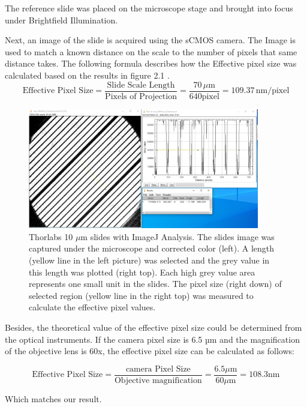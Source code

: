 \documentclass[a4paper,english,12pt,bibliography=totoc]{scrreprt}
\begin{document}
The reference slide was placed on the microscope stage and brought into focus under Brightfield Illumination.

Next, an image of the slide is acquired using the sCMOS camera. The Image is used to match a known distance on the scale to the number of pixels that same distance takes.
The following formula describes how the Effective pixel size was calculated based on the results in figure 2.1 .
\[
\text{Effective Pixel Size} = \frac{\text{Slide Scale Length}}{\text{Pixels of Projection}} = \frac{70 \, \mu\text{m}}{640 \text{pixel}} = 109.37  \, \text{nm/pixel}
\]
\begin{figure}[H]
    \centering
    \includegraphics[width=0.9\textwidth]{Images/Ruler/measurements.png}
    \caption{Thorlabs 10 $\mu$m slides with ImageJ Analysis. The slides image was captured under the microscope and corrected color (left). A length (yellow line in the left picture) was selected and the grey value in this length was plotted (right top). Each high grey value area represents one small unit in the slides. The pixel size (right down) of selected region (yellow line in the right top) was measured to calculate the effective pixel values.}
    \label{fig:npc}
\end{figure}

Besides, the theoretical value of the effective pixel size could be determined from the optical instruments. If the camera pixel size is 6.5 µm and the magnification of the objective lens is 60x, the effective pixel size can be calculated as follows:

\[
\text{Effective Pixel Size} = \frac{\text{camera Pixel Size}}{\text{Objective magnification}} = \frac{ 6.5   \mu\text{m}}{ 60 \mu\text{m}} =  108.3\text{nm}
\]

Which matches our result.
\end{document}

